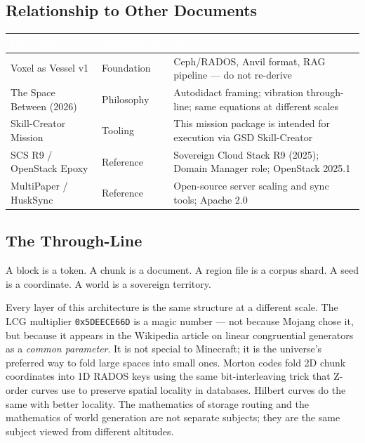 \documentclass[11pt,letterpaper]{article}
\newcommand{\tableheader}[1]{\textbf{\sffamily\textcolor{white}{#1}}}
\begin{document}
\subsection{Relationship to Other Documents}

\begin{center}
\begin{tabularx}{\textwidth}{L{4cm}L{3cm}X}
\toprule
{}
\tableheader{Document} & \tableheader{Relationship} & \tableheader{Notes} \\
\midrule
Voxel as Vessel v1 & Foundation & Ceph/RADOS, Anvil format, RAG pipeline --- do not re-derive \\
The Space Between (2026) & Philosophy & Autodidact framing; vibration through-line; same equations at different scales \\
Skill-Creator Mission & Tooling & This mission package is intended for execution via GSD Skill-Creator \\
SCS R9 / OpenStack Epoxy & Reference & Sovereign Cloud Stack R9 (2025); Domain Manager role; OpenStack 2025.1 \\
MultiPaper / HuskSync & Reference & Open-source server scaling and sync tools; Apache 2.0 \\
\bottomrule
\end{tabularx}
\end{center}

\subsection{The Through-Line}

A block is a token. A chunk is a document. A region file is a corpus shard. A seed is a coordinate. A world is a sovereign territory.

Every layer of this architecture is the same structure at a different scale. The LCG multiplier \texttt{0x5DEECE66D} is a magic number --- not because Mojang chose it, but because it appears in the Wikipedia article on linear congruential generators as a \emph{common parameter}. It is not special to Minecraft; it is the universe's preferred way to fold large spaces into small ones. Morton codes fold 2D chunk coordinates into 1D RADOS keys using the same bit-interleaving trick that Z-order curves use to preserve spatial locality in databases. Hilbert curves do the same with better locality. The mathematics of storage routing and the mathematics of world generation are not separate subjects; they are the same subject viewed from different altitudes.
\end{document}
